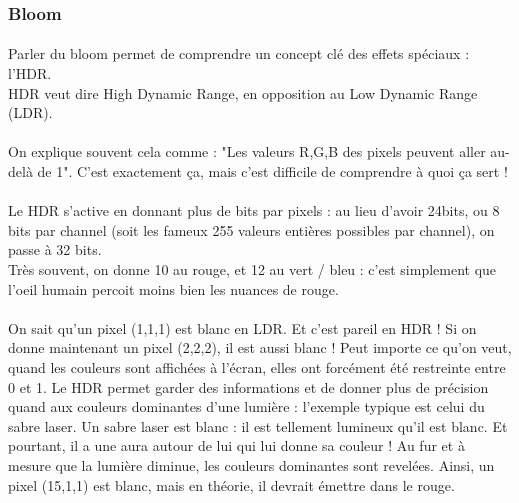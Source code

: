 \documentclass{EPUProjetDi}
\begin{document}
\pagebreak
\subsubsection{Bloom} %


\paragraph{}
Parler du bloom permet de comprendre un concept clé des effets spéciaux : l'HDR.\\
HDR veut dire High Dynamic Range, en opposition au Low Dynamic Range (LDR).\\\\
On explique souvent cela comme : "Les valeurs R,G,B des pixels peuvent aller au-delà de 1". C'est exactement ça, mais c'est difficile de comprendre à quoi ça sert ! \\\\
Le HDR s'active en donnant plus de bits par pixels : au lieu d'avoir 24bits, ou 8 bits par channel (soit les fameux 255 valeurs entières possibles par channel), on passe à 32 bits.\\
Très souvent, on donne 10 au rouge, et 12 au vert / bleu : c'est simplement que l'oeil humain percoit moins bien les nuances de rouge.

\paragraph{}
On sait qu'un pixel (1,1,1) est blanc en LDR.  Et c'est pareil en HDR ! Si on donne maintenant un pixel (2,2,2), il est aussi blanc !
Peut importe ce qu'on veut, quand les couleurs sont affichées à l'écran, elles ont forcément été restreinte entre 0 et 1.
Le HDR permet garder des informations et de donner plus de précision quand aux couleurs dominantes d'une lumière : l'exemple typique est celui du sabre laser.
Un sabre laser est blanc : il est tellement lumineux qu'il est blanc. Et pourtant, il a une aura autour de lui qui lui donne sa couleur ! Au fur et à mesure que la lumière diminue, les couleurs dominantes sont revelées.
Ainsi, un pixel (15,1,1) est blanc, mais en théorie, il devrait émettre dans le rouge.
\end{document}

